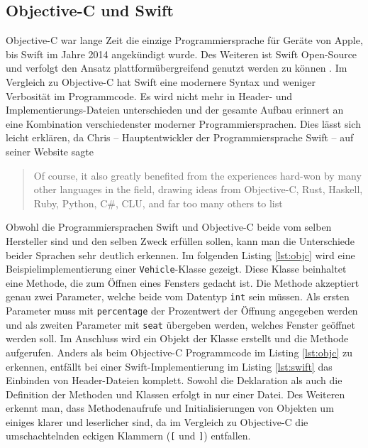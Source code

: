 \subsection{Objective-C und Swift}
Objective-C war lange Zeit die einzige Programmiersprache für Geräte von Apple, bis Swift im Jahre 2014 angekündigt wurde.
Des Weiteren ist Swift Open-Source und verfolgt den Ansatz plattformübergreifend genutzt werden zu können \parencite{APP2020}.
Im Vergleich zu Objective-C hat Swift eine modernere Syntax und weniger Verbosität im Programmcode.
Es wird nicht mehr in Header- und Implementierungs-Dateien unterschieden und der gesamte Aufbau erinnert an eine Kombination verschiedenster moderner Programmiersprachen.
Dies lässt sich leicht erklären, da Chris \textcite{LAT} – Hauptentwickler der Programmiersprache Swift – auf seiner Website sagte \blockquote{Of course, it also greatly benefited from the experiences hard-won by many other languages in the field, drawing ideas from Objective-C, Rust, Haskell, Ruby, Python, C\#, CLU, and far too many others to list}.\pbreak%
%
Obwohl die Programmiersprachen Swift und Objective-C beide vom selben Hersteller sind und den selben Zweck erfüllen sollen, kann man die Unterschiede beider Sprachen sehr deutlich erkennen.
Im folgenden Listing \ref{lst:objc} wird eine Beispielimplementierung einer \texttt{Vehicle}-Klasse gezeigt. Diese Klasse beinhaltet eine Methode, die zum Öffnen eines Fensters gedacht ist.
Die Methode akzeptiert genau zwei Parameter, welche beide vom Datentyp \texttt{int} sein müssen.
Als ersten Parameter muss mit \texttt{percentage} der Prozentwert der Öffnung angegeben werden und als zweiten Parameter mit \texttt{seat} übergeben werden, welches Fenster geöffnet werden soll.
Im Anschluss wird ein Objekt der Klasse erstellt und die Methode aufgerufen.
Anders als beim Objective-C Programmcode im Listing \ref{lst:objc} zu erkennen, entfällt bei einer Swift-Implementierung im Listing \ref{lst:swift} das Einbinden von Header-Dateien komplett.
Sowohl die Deklaration als auch die Definition der Methoden und Klassen erfolgt in nur einer Datei.
Des Weiteren erkennt man, dass Methodenaufrufe und Initialisierungen von Objekten um einiges klarer und leserlicher sind, da im Vergleich zu Objective-C die umschachtelnden eckigen Klammern (\texttt{[} und \texttt{]}) entfallen.


